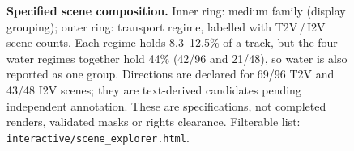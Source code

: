 \begin{figure}[t]
\centering
{}
\caption{\textbf{Specified scene composition.} Inner ring: medium family (display grouping); outer ring:
transport regime, labelled with T2V\,/\,I2V scene counts. Each regime holds 8.3--12.5\% of a track, but the four
water regimes together hold 44\% (42/96 and 21/48), so water is also reported as one group. Directions are
declared for 69/96 T2V and 43/48 I2V scenes; they are text-derived candidates pending independent annotation.
These are specifications, not completed renders, validated masks or rights clearance. Filterable list:
\texttt{interactive/scene\_explorer.html}.}
\label{fig:pp_scene_distribution}
\end{figure}
